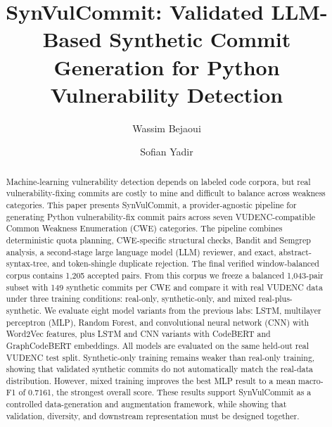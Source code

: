 \documentclass[sigconf,nonacm]{acmart}
\title{SynVulCommit: Validated LLM-Based Synthetic Commit Generation for Python Vulnerability Detection}
\author{Wassim Bejaoui}
\affiliation{\institution{University of Passau}\department{Faculty of Computer Science and Mathematics}\city{Passau}\country{Germany}}
\author{Sofian Yadir}
\affiliation{\institution{University of Passau}\department{Faculty of Computer Science and Mathematics}\city{Passau}\country{Germany}}
\begin{document}
\begin{abstract}
Machine-learning vulnerability detection depends on labeled code corpora, but real vulnerability-fixing commits are costly to mine and difficult to balance across weakness categories. This paper presents SynVulCommit, a provider-agnostic pipeline for generating Python vulnerability-fix commit pairs across seven VUDENC-compatible Common Weakness Enumeration (CWE) categories. The pipeline combines deterministic quota planning, CWE-specific structural checks, Bandit and Semgrep analysis, a second-stage large language model (LLM) reviewer, and exact, abstract-syntax-tree, and token-shingle duplicate rejection. The final verified window-balanced corpus contains 1,205 accepted pairs. From this corpus we freeze a balanced 1,043-pair subset with 149 synthetic commits per CWE and compare it with real VUDENC data under three training conditions: real-only, synthetic-only, and mixed real-plus-synthetic. We evaluate eight model variants from the previous labs: LSTM, multilayer perceptron (MLP), Random Forest, and convolutional neural network (CNN) with Word2Vec features, plus LSTM and CNN variants with CodeBERT and GraphCodeBERT embeddings. All models are evaluated on the same held-out real VUDENC test split. Synthetic-only training remains weaker than real-only training, showing that validated synthetic commits do not automatically match the real-data distribution. However, mixed training improves the best MLP result to a mean macro-F1 of 0.7161, the strongest overall score. These results support SynVulCommit as a controlled data-generation and augmentation framework, while showing that validation, diversity, and downstream representation must be designed together.
\end{abstract}
\maketitle


\end{document}
